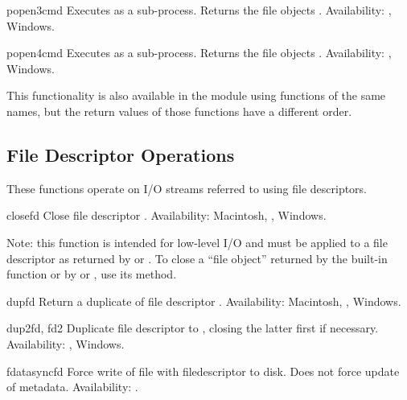 \begin{funcdesc}{popen3}{cmd}
Executes  as a sub-process.  Returns the file objects
.
Availability: \UNIX, Windows.
\end{funcdesc}

\begin{funcdesc}{popen4}{cmd}
Executes  as a sub-process.  Returns the file objects
.
Availability: \UNIX, Windows.
\end{funcdesc}

This functionality is also available in the  module
using functions of the same names, but the return values of those
functions have a different order.


\subsection{File Descriptor Operations \label{os-fd-ops}}

These functions operate on I/O streams referred to
using file descriptors.


\begin{funcdesc}{close}{fd}
Close file descriptor .
Availability: Macintosh, \UNIX, Windows.

Note: this function is intended for low-level I/O and must be applied
to a file descriptor as returned by  or
.  To close a ``file object'' returned by the
built-in function  or by  or
, use its  method.
\end{funcdesc}

\begin{funcdesc}{dup}{fd}
Return a duplicate of file descriptor .
Availability: Macintosh, \UNIX, Windows.
\end{funcdesc}

\begin{funcdesc}{dup2}{fd, fd2}
Duplicate file descriptor  to , closing the latter
first if necessary.
Availability: \UNIX, Windows.
\end{funcdesc}

\begin{funcdesc}{fdatasync}{fd}
Force write of file with filedescriptor  to disk.
Does not force update of metadata.
Availability: \UNIX.
\end{funcdesc}


